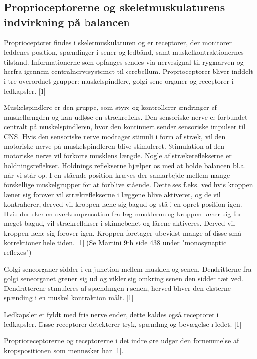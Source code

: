 
\subsection{Proprioceptorerne og skeletmuskulaturens indvirkning på balancen}
Proprioceptorer findes i skeletmuskulaturen og er receptorer, der monitorer leddenes position, spændinger i sener og ledbånd, samt muskelkontraktionernes tilstand. Informationerne som opfanges sendes via nervesignal til rygmarven og herfra igennem centralnervesystemet til cerebellum. Proprioceptorer bliver inddelt i tre overordnet grupper: muskelspindlere, golgi sene organer og receptorer i ledkapsler. [1]

Muskelspindlere er den gruppe, som styre og kontrollerer ændringer af muskellængden og kan udløse en strækrefleks. Den sensoriske nerve er forbundet centralt på muskelspindleren, hvor den kontinuert sender sensoriske impulser til CNS. Hvis den sensoriske nerve modtager stimuli i form af stræk, vil den motoriske nerve på muskelspindleren blive stimuleret. Stimulation af den motoriske nerve vil forkorte musklens længde. 
Nogle af strækereflekserne er holdningsreflekser. Holdnings reflekserne hjælper os med at holde balancen bl.a. når vi står op. I en stående position kræves der samarbejde mellem mange forskellige muskelgrupper for at forblive stående. Dette ses f.eks. ved hvis kroppen læner sig forover vil strækreflekserne i læggene blive aktiveret, og de vil kontraherer, derved vil kroppen læne sig bagud og stå i en opret position igen. Hvis der sker en overkompensation fra læg musklerne og kroppen læner sig for meget bagud, vil strækreflekser i skinnebenet og lårene aktiveres. Derved vil kroppen læne sig forover igen. Kroppen foretager ubevidst mange af disse små korrektioner hele tiden. [1]  (Se Martini 9th side 438 under "monosynaptic reflexes")  

Golgi seneorganer sidder i en junction mellem musklen og senen. Dendritterne fra golgi seneorganet grener sig ud og vikler sig omkring senen den sidder tæt ved. Dendritterene stimuleres af spændingen i senen, herved bliver den eksterne spænding i en muskel kontraktion målt. [1] 

Ledkapsler er fyldt med frie nerve ender, dette kaldes også receptorer i ledkapsler. Disse receptorer detekterer tryk, spænding og bevægelse i ledet. [1]

Proprioreceptorerne og receptorerne i det indre øre udgør den fornemmelse af kropspositionen som mennesker har [1].


